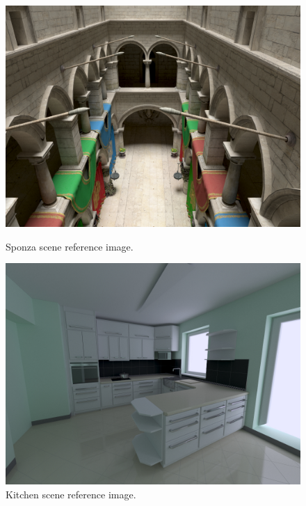\begin{figure}[h]
\centering
\begin{minipage}[b]{0.3\linewidth}
\includegraphics[width=\linewidth]{img/sponza_ref.jpg}
\caption{\label{img:sponza_ref} Sponza scene reference image.}
\end{minipage}
\quad
\begin{minipage}[b]{0.3\linewidth}
\includegraphics[width=\linewidth]{img/kitchen_ref.jpg}
\caption{\label{img:kitchen_ref} Kitchen scene reference image.}
\end{minipage}
\quad
\begin{minipage}[b]{0.3\linewidth}

\end{minipage}
\end{figure}
